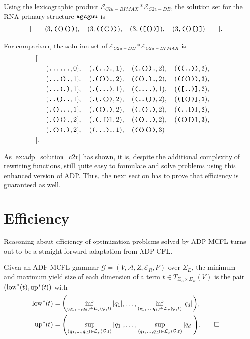 \documentclass[
    a4paper,
    12pt,
    twoside,
    BCOR=12mm,
    parskip=half,
    chapterprefix,
    numbers=noenddot,
    bibliography=totoc
]{scrbook}
\begin{document}
\begin{example}
	Using the lexicographic product $\mathcal{E}_{C2u-BPMAX}*\mathcal{E}_{C2u-DB}$, the solution set for the RNA primary structure $\ts{agcguu}$ is	
	\[ [\qquad (3,\ts{(()())}),\quad (3,\ts{((()))}),\quad (3,\ts{([())]}),\quad (3,\ts{(()[)]}) \qquad]. \]
	
	For comparison, the solution set of $\mathcal{E}_{C2u-DB}*\mathcal{E}_{C2u-BPMAX}$ is
	\begin{align*}
		&[\\
		&&&(\ts{......},0),\quad (\ts{.(..).},1),\quad (\ts{(.()).},2),\quad (\ts{((..))},2), \\
		&&&(\ts{...().},1),\quad (\ts{.(()).},2),\quad (\ts{(().).},2),\quad (\ts{((()))},3), \\
		&&&(\ts{...(.)},1),\quad (\ts{.(...)},1),\quad (\ts{(....)},1),\quad (\ts{([..)]},2), \\
		&&&(\ts{..()..},1),\quad (\ts{.(.())},2),\quad (\ts{(..())},2),\quad (\ts{([())]},3), \\
		&&&(\ts{.()...},1),\quad (\ts{.(().)},2),\quad (\ts{(.().)},2),\quad (\ts{(..[)]},2), \\
		&&&(\ts{.()().},2),\quad (\ts{.(.[)]},2),\quad (\ts{(()..)},2),\quad (\ts{(()[)]},3), \\
		&&&(\ts{.()(.)},2),\quad (\ts{(...).},1),\quad (\ts{(()())},3) \\
		&].
	\end{align*}
\end{example}

As \cref{ex:adp_solution_c2u} has shown, it is, despite the additional complexity of rewriting functions, still quite easy to formulate and solve problems using this enhanced version of ADP. Thus, the next section has to prove that efficiency is guaranteed as well.

\section{Efficiency}
\label{sec:adpmcfl_efficiency}

Reasoning about efficiency of optimization problems solved by ADP-MCFL turns out to be a straight-forward adaptation from ADP-CFL.

\begin{definition}
  \label{eq:yieldsizemcfl}
	Given an ADP-MCFL grammar $\mathcal{G}=(V,\mathcal{A},Z,\mathcal{E}_R,P)$ over $\Sigma_E$, the minimum and maximum yield size of each dimension of a term $t \in T_{\Sigma_E \times \Sigma_R}(V)$ is the pair $(\mathrm{low}^*(t),\mathrm{up}^*(t))$ with
	\begin{align*}
		\op{low}^*(t) &= \left( \inf_{(q_1,\ldots,q_d) \in \mathcal{L}_\op{y}(\mathcal{G},t)} |q_1|,\ldots,\inf_{(q_1,\ldots,q_d) \in \mathcal{L}_\op{y}(\mathcal{G},t)} |q_d| \right),\\
		\op{up}^*(t) &= \left( \sup_{(q_1,\ldots,q_d) \in \mathcal{L}_\op{y}(\mathcal{G},t)} |q_1|,\ldots,\sup_{(q_1,\ldots,q_d) \in \mathcal{L}_\op{y}(\mathcal{G},t)} |q_d| \right).\qedhere
	\end{align*}
\end{definition}
\end{document}
